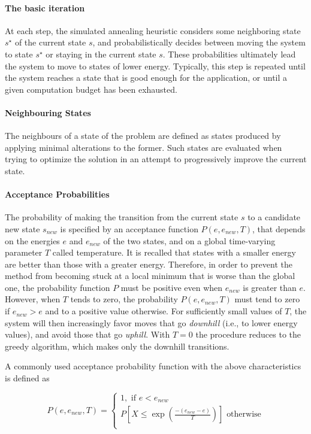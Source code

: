 \paragraph{The basic iteration} At each step, the simulated annealing heuristic considers some neighboring state $s^\star$ of the current state $s$, and probabilistically decides between moving the system to state $s^\star$ or staying in the current state $s$. These probabilities ultimately lead the system to move to states of lower energy. Typically, this step is repeated until the system reaches a state that is good enough for the application, or until a given computation budget has been exhausted.

\paragraph{Neighbouring States} The neighbours of a state of the problem are defined as states produced by applying minimal alterations to the former. Such states are evaluated when trying to optimize the solution in an attempt to progressively improve the current state.

\paragraph{Acceptance Probabilities}  The probability of making the transition from the current state $s$ to a candidate new state $s_{new}$ is specified by an acceptance function $P(e, e_{new}, T)$, that depends on the energies $e$ and $e_{new}$ of the two states, and on a global time-varying parameter $T$ called temperature.
It is recalled that states with a smaller energy are better than those with a greater energy. Therefore, in order to prevent the method from becoming stuck at a local minimum that is worse than the global one, the probability function $P$ must be positive even when  $e_{new}$ is greater than $e$. However, when $T$ tends to zero, the probability $P(e, e_{new}, T)$ must tend to zero if $e_{new} > e$ and to a positive value otherwise. For sufficiently small values of $T$, the system will then increasingly favor moves that go \textit{downhill} (i.e., to lower energy values), and avoid those that go \textit{uphill}. With $T = 0$ the procedure reduces to the greedy algorithm, which makes only the downhill transitions.
\par
A commonly used acceptance probability function with the above characteristics is defined as

$$
P(e, e_{new}, T) = \left\{
    \begin{array}{ll}
          1, \text{ if } e < e_{new} \\
          P[X \leq \exp({\frac{-(e_{new} - e)}{T}})] \text{ otherwise} \\
    \end{array} 
\right.
$$

